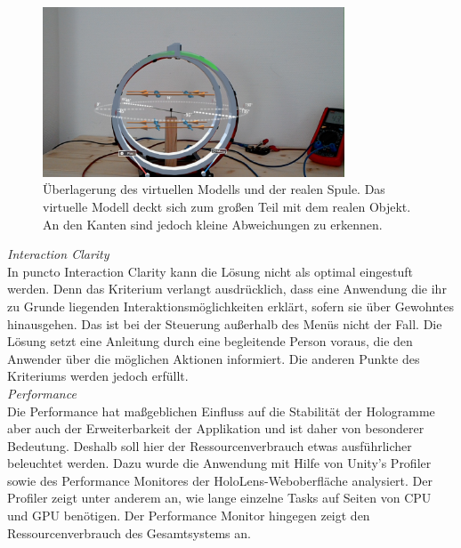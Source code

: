 \begin{figure}[h!]
	\centering
	\includegraphics[width=0.8\textwidth]{images/HL/model-overlay.jpg}
	\caption{Überlagerung des virtuellen Modells und der realen Spule. Das virtuelle Modell deckt sich zum großen Teil mit dem realen Objekt. An den Kanten sind jedoch kleine Abweichungen zu erkennen.}
	\label{img:model-overlay}
\end{figure}

\textit{Interaction Clarity}\\
In puncto Interaction Clarity kann die Lösung nicht als optimal eingestuft werden. Denn das Kriterium verlangt ausdrücklich, dass eine Anwendung die ihr zu Grunde liegenden Interaktionsmöglichkeiten erklärt, sofern sie über Gewohntes hinausgehen. Das ist bei der Steuerung außerhalb des Menüs nicht der Fall. Die Lösung setzt eine Anleitung durch eine begleitende Person voraus, die den Anwender über die möglichen Aktionen informiert. Die anderen Punkte des Kriteriums werden jedoch erfüllt.\\

\textit{Performance}\\
Die Performance hat maßgeblichen Einfluss auf die Stabilität der Hologramme aber auch der Erweiterbarkeit der Applikation und ist daher von besonderer Bedeutung. Deshalb soll hier der Ressourcenverbrauch etwas ausführlicher beleuchtet werden. Dazu wurde die Anwendung mit Hilfe von Unity's Profiler sowie des Performance Monitores der HoloLens-Weboberfläche analysiert. Der Profiler zeigt unter anderem an, wie lange einzelne Tasks auf Seiten von CPU und GPU benötigen. Der Performance Monitor hingegen zeigt den Ressourcenverbrauch des Gesamtsystems an.\\

